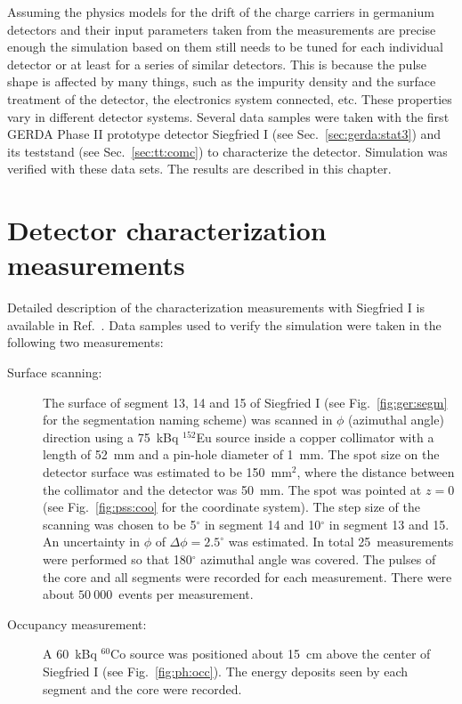 Assuming the physics models\cite{miha, bart} for the drift of the charge carriers in germanium detectors and their input parameters taken from the measurements\cite{miha, bart} are precise enough the simulation based on them still needs to be tuned for each individual detector or at least for a series of similar detectors. This is because the pulse shape is affected by many things, such as the impurity density and the surface treatment of the detector, the electronics system connected, etc. These properties vary in different detector systems. Several data samples were taken with the first GERDA Phase II prototype detector Siegfried I (see Sec.~\ref{sec:gerda:stat3}) and its teststand (see Sec.~\ref{sec:tt:comc}) to characterize the detector. Simulation was verified with these data sets. The results are described in this chapter.

\section{Detector characterization measurements}
\label{sec:psa:char}
Detailed description of the characterization measurements with Siegfried I is available in Ref.~\cite{Sie07}. Data samples used to verify the simulation were taken in the following two measurements:
\begin{description}
\item[Surface scanning:] The surface of segment 13, 14 and 15 of Siegfried I (see Fig.~\ref{fig:ger:segm} for the segmentation naming scheme) was scanned in $\phi$ (azimuthal angle) direction using a 75~kBq $^{152}$Eu source inside a copper collimator with a length of 52~mm and a pin-hole diameter of 1~mm. The spot size on the detector surface was estimated to be 150~mm$^{2}$, where the distance between the collimator and the detector was 50~mm. The spot was pointed at $z = 0$ (see Fig.~\ref{fig:pss:coo} for the coordinate system). The step size of the scanning was chosen to be 5$^{\circ}$ in segment 14 and 10$^{\circ}$ in segment 13 and 15. An uncertainty in $\phi$ of $\Delta \phi=2.5^{\circ}$ was estimated. In total 25~measurements were performed so that 180$^{\circ}$ azimuthal angle was covered. The pulses of the core and all segments were recorded for each measurement. There were about $50\ 000$~events per measurement.
\item[Occupancy measurement:] A 60~kBq $^{60}$Co source was positioned about 15~cm above the center of Siegfried I (see Fig.~\ref{fig:ph:occ}). The energy deposits seen by each segment and the core were recorded.
\end{description}

